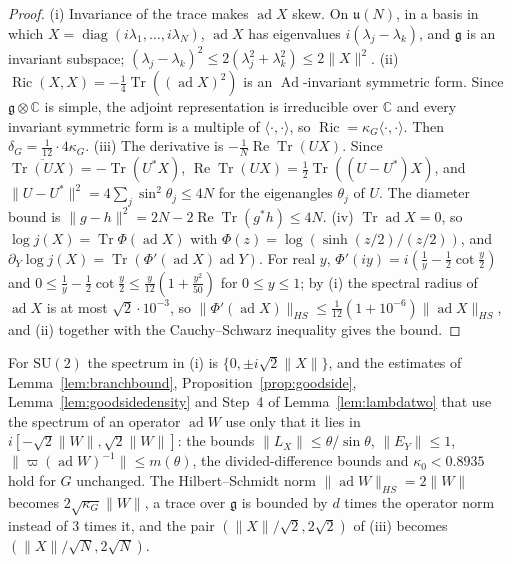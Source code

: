 \documentclass[11pt]{amsart}
\theoremstyle{definition}
\theoremstyle{remark}
\numberwithin{equation}{section}
\newcommand{\C}{\mathbb{C}}
\newcommand{\SU}{\mathrm{SU}}
\newcommand{\g}{\mathfrak{g}}
\newcommand{\Tr}{\operatorname{Tr}}
\newcommand{\ReTr}{\operatorname{Re}\operatorname{Tr}}
\newcommand{\Ric}{\operatorname{Ric}}
\newcommand{\ip}[2]{\langle #1,#2\rangle}
\begin{document}
\begin{proof}
(i) Invariance of the trace makes $\operatorname{ad}X$ skew. On $\mathfrak
u(N)$, in a basis in which $X=\operatorname{diag}(i\lambda_1,\dots,
i\lambda_N)$, $\operatorname{ad}X$ has eigenvalues $i(\lambda_j-
\lambda_k)$, and $\g$ is an invariant subspace; $(\lambda_j-\lambda_k)^2\le
2(\lambda_j^2+\lambda_k^2)\le2\lVert X\rVert^2$.
(ii) $\Ric(X,X)=-\frac14\Tr((\operatorname{ad}X)^2)$ is an
$\operatorname{Ad}$-invariant symmetric form. Since $\g\otimes\C$ is
simple, the adjoint representation is irreducible over $\C$ and every
invariant symmetric form is a multiple of $\ip\cdot\cdot$, so $\Ric=
\kappa_G\ip\cdot\cdot$. Then $\delta_G=\frac1{12}\cdot4\kappa_G$.
(iii) The derivative is $-\frac1N\ReTr(UX)$. Since $\overline{\Tr(UX)}=
-\Tr(U^*X)$, $\ReTr(UX)=\frac12\Tr((U-U^*)X)$, and $\lVert U-U^*\rVert^2=
4\sum_j\sin^2\theta_j\le4N$ for the eigenangles $\theta_j$ of $U$. The
diameter bound is $\lVert g-h\rVert^2=2N-2\ReTr(g^*h)\le4N$.
(iv) $\Tr\operatorname{ad}X=0$, so $\log j(X)=\Tr\Phi(\operatorname{ad}
X)$ with $\Phi(z)=\log(\sinh(z/2)/(z/2))$, and $\partial_Y\log j(X)=
\Tr(\Phi'(\operatorname{ad}X)\operatorname{ad}Y)$. For real $y$,
$\Phi'(iy)=i(\frac1y-\frac12\cot\frac y2)$ and $0\le\frac1y-\frac12\cot
\frac y2\le\frac y{12}(1+\frac{y^2}{50})$ for $0\le y\le1$; by (i) the
spectral radius of $\operatorname{ad}X$ is at most $\sqrt2\cdot10^{-3}$,
so $\lVert\Phi'(\operatorname{ad}X)\rVert_{HS}\le\frac1{12}(1+10^{-6})
\lVert\operatorname{ad}X\rVert_{HS}$, and (ii) together with the
Cauchy--Schwarz inequality gives the bound.
\end{proof}

For $\SU(2)$ the spectrum in (i) is $\{0,\pm i\sqrt2\lVert X\rVert\}$, and
the estimates of Lemma~\ref{lem:branchbound}, Proposition~\ref{prop:goodside},
Lemma~\ref{lem:goodsidedensity} and Step~4 of Lemma~\ref{lem:lambdatwo}
that use the spectrum of an operator $\operatorname{ad}W$ use only that it
lies in $i[-\sqrt2\lVert W\rVert,\sqrt2\lVert W\rVert]$: the bounds
$\lVert L_X\rVert\le\theta/\sin\theta$, $\lVert E_Y\rVert\le1$,
$\lVert\varpi(\operatorname{ad}W)^{-1}\rVert\le m(\theta)$, the
divided-difference bounds and $\kappa_0<0.8935$ hold for $G$ unchanged.
The Hilbert--Schmidt norm $\lVert\operatorname{ad}W\rVert_{HS}=2\lVert W
\rVert$ becomes $2\sqrt{\kappa_G}\lVert W\rVert$, a trace over $\g$ is
bounded by $d$ times the operator norm instead of $3$ times it, and the
pair $(\lVert X\rVert/\sqrt2,2\sqrt2)$ of (iii) becomes $(\lVert X\rVert/
\sqrt N,2\sqrt N)$.
\end{document}
